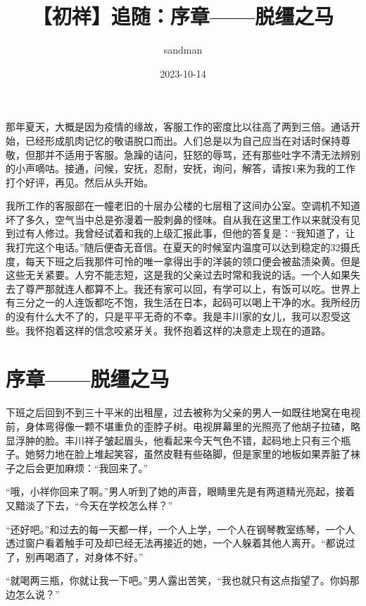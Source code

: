 \documentclass{article}
\title{【初祥】追随：序章——脱缰之马}
\author{sandman}
\date{2023-10-14}
\begin{document}



\Large

那年夏天，大概是因为疫情的缘故，客服工作的密度比以往高了两到三倍。通话开始，已经形成肌肉记忆的敬语脱口而出。人们总是以为自己应当在对话时保持尊敬，但那并不适用于客服。急躁的诘问，狂怒的辱骂，还有那些吐字不清无法辨别的小声嘀咕。接通，问候，安抚，忍耐，安抚，询问，解答，请按1来为我的工作打个好评，再见。然后从头开始。



我所工作的客服部在一幢老旧的十层办公楼的七层租了这间办公室。空调机不知道坏了多久，空气当中总是弥漫着一股刺鼻的怪味。自从我在这里工作以来就没有见到过有人修过。我曾经试着和我的上级汇报此事，但他的答复是：“我知道了，让我打完这个电话。”随后便杳无音信。在夏天的时候室内温度可以达到稳定的32摄氏度，每天下班之后我那件可怜的唯一拿得出手的洋装的领口便会被盐渍染黄。但是这些无关紧要。人穷不能志短，这是我的父亲过去时常和我说的话。一个人如果失去了尊严那就连人都算不上。我还有家可以回，有学可以上，有饭可以吃。世界上有三分之一的人连饭都吃不饱，我生活在日本，起码可以喝上干净的水。我所经历的没有什么大不了的，只是平平无奇的不幸。我是丰川家的女儿，我可以忍受这些。我怀抱着这样的信念咬紧牙关。我怀抱着这样的决意走上现在的道路。





{\centering\section*{序章——脱缰之马}}





下班之后回到不到三十平米的出租屋，过去被称为父亲的男人一如既往地窝在电视前，身体弯得像一颗不堪重负的歪脖子树。电视屏幕里的光照亮了他胡子拉碴，略显浮肿的脸。丰川祥子皱起眉头，他看起来今天气色不错，起码地上只有三个瓶子。她努力地在脸上堆起笑容，虽然皮鞋有些硌脚，但是家里的地板如果弄脏了袜子之后会更加麻烦：“我回来了。”



“哦，小祥你回来了啊。”男人听到了她的声音，眼睛里先是有两道精光亮起，接着又黯淡了下去，“今天在学校怎么样？”



“还好吧。”和过去的每一天都一样，一个人上学，一个人在钢琴教室练琴，一个人透过窗户看着触手可及却已经无法再接近的她，一个人躲着其他人离开。“都说过了，别再喝酒了，对身体不好。”



“就喝两三瓶，你就让我一下吧。”男人露出苦笑，“我也就只有这点指望了。你妈那边怎么说？”
\end{document}
